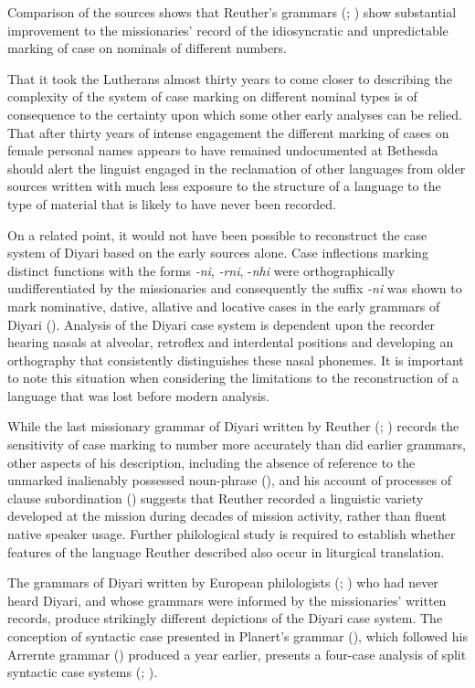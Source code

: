 Comparison of the sources shows that Reuther’s grammars (\citeyear{reuther_dieri_1894}; \citeyear{reuther_ms_1899}) show substantial improvement to the missionaries' record of the idiosyncratic and unpredictable marking of case on nominals of different numbers.

That it took the Lutherans almost thirty years to come closer to describing the complexity of the system of case marking on different nominal types is of consequence to the certainty upon which some other early analyses can be relied. That after thirty years of intense engagement the different marking of cases on female personal names appears to have remained undocumented at Bethesda should alert the linguist engaged in the reclamation of other languages from older sources written with much less exposure to the structure of a language to the type of material that is likely to have never been recorded.

On a related point, it would not have been possible to reconstruct the case system of Diyari based on the early sources alone. Case inflections marking distinct functions with the forms \textit{-ni}, \textit{{}-rni}, -\textit{nhi} were orthographically undifferentiated by the missionaries and consequently the suffix \textit{-ni} was shown to mark nominative, dative, allative and locative cases in the early grammars of Diyari (). Analysis of the Diyari case system is dependent upon the recorder hearing nasals at alveolar, retroflex and interdental positions and developing an orthography that consistently distinguishes these nasal phonemes. It is important to note this situation when considering the limitations to the reconstruction of a language that was lost before modern analysis.

While the last missionary grammar of Diyari written by Reuther (\citeyear{reuther_dieri_1894}; \citeyear{reuther_ms_1899}) records the sensitivity of case marking to number more accurately than did earlier grammars,  other aspects of his description, including the absence of reference to the unmarked inalienably possessed noun-phrase (), and his account of processes of clause subordination () suggests that Reuther recorded a linguistic variety developed at the mission during decades of mission activity, rather than fluent native speaker usage. Further philological study is required to establish whether features of the language Reuther described also occur in liturgical translation.

The grammars of Diyari written by European philologists (\citealt{planert_australische_1908}; \citealt{gatti_lingua_1930}) who had never heard Diyari, and whose grammars were informed by the missionaries' written records, produce strikingly different depictions of the Diyari case system. The conception of syntactic case presented in Planert’s grammar (\citeyear{planert_australische_1908}), which followed his Arrernte grammar (\citeyear{planert_australische_1907}) produced a year earlier, presents a four-case analysis of split syntactic case systems (\citealt[132]{dixon_preface_2002}; ).



